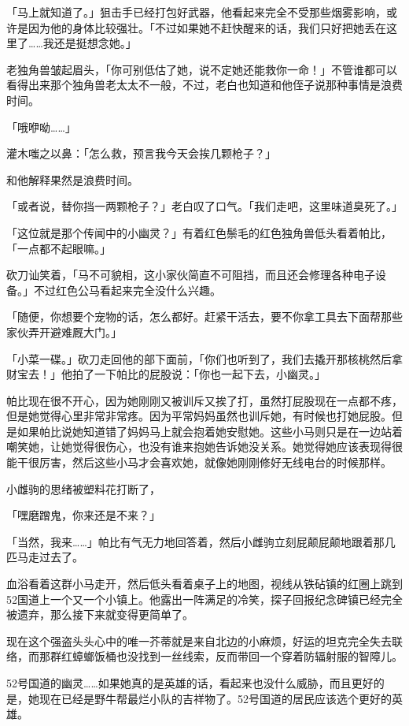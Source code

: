 「马上就知道了。」狙击手已经打包好武器，他看起来完全不受那些烟雾影响，或许是因为他的身体比较强壮。「不过如果她不赶快醒来的话，我们只好把她丢在这里了……我还是挺想念她。」

老独角兽皱起眉头，「你可别低估了她，说不定她还能救你一命！」不管谁都可以看得出来那个独角兽老太太不一般，不过，老白也知道和他侄子说那种事情是浪费时间。

「哦咿呦……」

灌木嗤之以鼻：「怎么救，预言我今天会挨几颗枪子？」

和他解释果然是浪费时间。

「或者说，替你挡一两颗枪子？」老白叹了口气。「我们走吧，这里味道臭死了。」

\horizonline


「这位就是那个传闻中的小幽灵？」有着红色鬃毛的红色独角兽低头看着帕比，「一点都不起眼嘛。」

砍刀讪笑着，「马不可貌相，这小家伙简直不可阻挡，而且还会修理各种电子设备。」不过红色公马看起来完全没什么兴趣。

「随便，你想要个宠物的话，怎么都好。赶紧干活去，要不你拿工具去下面帮那些家伙弄开避难厩大门。」

「小菜一碟。」砍刀走回他的部下面前，「你们也听到了，我们去撬开那核桃然后拿财宝去！」他拍了一下帕比的屁股说：「你也一起下去，小幽灵。」

帕比现在很不开心，因为她刚刚又被训斥又挨了打，虽然打屁股现在一点都不疼，但是她觉得心里非常非常疼。因为平常妈妈虽然也训斥她，有时候也打她屁股。但是如果帕比说她知道错了妈妈马上就会抱着她安慰她。这些小马则只是在一边站着嘲笑她，让她觉得很伤心，也没有谁来抱她告诉她没关系。她觉得她应该表现得很能干很厉害，然后这些小马才会喜欢她，就像她刚刚修好无线电台的时候那样。

小雌驹的思绪被塑料花打断了，

「嘿磨蹭鬼，你来还是不来？」

「当然，我来……」帕比有气无力地回答着，然后小雌驹立刻屁颠屁颠地跟着那几匹马走过去了。

血浴看着这群小马走开，然后低头看着桌子上的地图，视线从铁砧镇的红圈上跳到52国道上一个又一个小镇上。他露出一阵满足的冷笑，探子回报纪念碑镇已经完全被遗弃，那么接下来就变得更简单了。

现在这个强盗头头心中的唯一芥蒂就是来自北边的小麻烦，好运的坦克完全失去联络，而那群红蟑螂饭桶也没找到一丝线索，反而带回一个穿着防辐射服的智障儿。

52号国道的幽灵……如果她真的是英雄的话，看起来也没什么威胁，而且更好的是，她现在已经是野牛帮最烂小队的吉祥物了。52号国道的居民应该选个更好的英雄。

